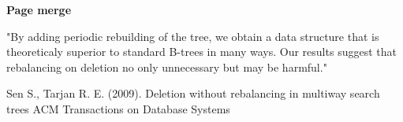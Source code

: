 \documentclass[usenames,dvipsnames, 18pt, compress, aspectratio=169]{beamer}
\begin{document}
\begin{frame}[fragile]{}
\begin{center}
\begin{overprint}[8cm]

    \end{overprint}
    \end{center}

\end{frame}

\begin{frame}[fragile]{}
    \frametitle{}

    \begin{center}
    \textbf{Page merge}
    \end{center}

    \begin{flushleft}
        \begin{displayquote}
            "By adding periodic rebuilding of the tree, we obtain a data
            structure that is theoreticaly superior to standard B-trees in many
            ways. Our results suggest that rebalancing on deletion no only
            unnecessary but may be harmful."
        \end{displayquote}
        \footnotesize{Sen S., Tarjan R. E. (2009). Deletion without rebalancing
            in multiway search trees ACM Transactions on Database Systems}
    \end{flushleft}

\end{frame}
\end{document}
